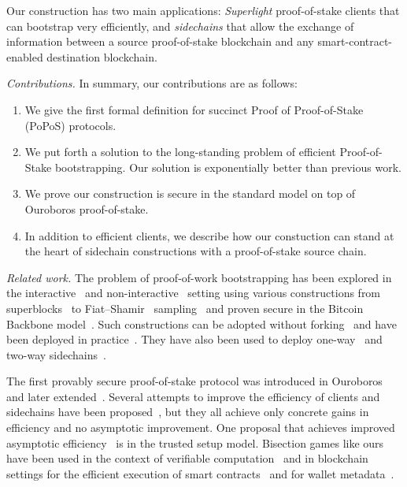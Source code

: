 Our construction has two main applications: \emph{Superlight} proof-of-stake clients that can
bootstrap very efficiently, and \emph{sidechains} that allow the exchange of information between
a source proof-of-stake blockchain and any smart-contract-enabled destination blockchain.

\noindent
\emph{Contributions.} In summary, our contributions are as follows:

\begin{enumerate}
  \item We give the first formal definition for succinct Proof of Proof-of-Stake (PoPoS) protocols.
  \item We put forth a solution to the long-standing problem of efficient Proof-of-Stake bootstrapping.
        Our solution is exponentially better than previous work.
  \item We prove our construction is secure in the standard model on top of Ouroboros proof-of-stake.
  \item In addition to efficient clients, we describe how our constuction can stand at the heart of
        sidechain constructions with a proof-of-stake source chain.
\end{enumerate}

\noindent
\emph{Related work.} The problem of proof-of-work bootstrapping has been explored in the interactive~\cite{popow}
and non-interactive~\cite{nipopows} setting using various constructions from superblocks~\cite{compactsuperblocks}
to Fiat--Shamir~\cite{fiatshamir} sampling~\cite{flyclient} and proven secure in the Bitcoin Backbone
model~\cite{backbone,backbone-new,varbackbone}. Such constructions can be adopted without
forking~\cite{velvet,velvet-nipopows} and have been deployed in practice~\cite{gas-efficient}. They have
also been used to deploy one-way~\cite{burn} and two-way sidechains~\cite{sidechains,pow-sidechains,crosschain-sok}.

The first provably secure proof-of-stake protocol was introduced in
Ouroboros~\cite{ouroboros} and later extended~\cite{praos,genesis}. Several attempts to improve the efficiency
of clients and sidechains have been proposed~\cite{pos-sidechains,mithril}, but they all achieve only concrete gains in efficiency
and no asymptotic improvement. One proposal that achieves improved asymptotic efficiency~\cite{coda} is in the
trusted setup model. Bisection games like ours have been used in the context of verifiable computation~\cite{refereed-computation}
and in blockchain settings for the efficient execution of smart contracts~\cite{arbitrum}
and for wallet metadata~\cite{wallets}.

